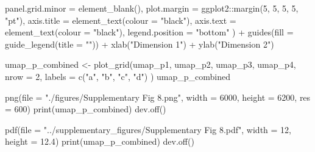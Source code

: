 \documentclass[
  11pt,
  oneside]{book}
\newenvironment{Shaded}{\begin{snugshade}}{\end{snugshade}}
\newcommand{\AttributeTok}[1]{\textcolor[rgb]{0.77,0.63,0.00}{#1}}
\newcommand{\DecValTok}[1]{\textcolor[rgb]{0.00,0.00,0.81}{#1}}
\newcommand{\FloatTok}[1]{\textcolor[rgb]{0.00,0.00,0.81}{#1}}
\newcommand{\FunctionTok}[1]{\textcolor[rgb]{0.00,0.00,0.00}{#1}}
\newcommand{\NormalTok}[1]{#1}
\newcommand{\OtherTok}[1]{\textcolor[rgb]{0.56,0.35,0.01}{#1}}
\newcommand{\SpecialCharTok}[1]{\textcolor[rgb]{0.00,0.00,0.00}{#1}}
\newcommand{\StringTok}[1]{\textcolor[rgb]{0.31,0.60,0.02}{#1}}
\begin{document}
\begin{Shaded}
\begin{Highlighting}[]
    \AttributeTok{panel.grid.minor =} \FunctionTok{element\_blank}\NormalTok{(),}
    \AttributeTok{plot.margin =}\NormalTok{ ggplot2}\SpecialCharTok{::}\FunctionTok{margin}\NormalTok{(}\DecValTok{5}\NormalTok{, }\DecValTok{5}\NormalTok{, }\DecValTok{5}\NormalTok{, }\DecValTok{5}\NormalTok{, }\StringTok{"pt"}\NormalTok{),}
    \AttributeTok{axis.title =} \FunctionTok{element\_text}\NormalTok{(}\AttributeTok{colour =} \StringTok{"black"}\NormalTok{),}
    \AttributeTok{axis.text =} \FunctionTok{element\_text}\NormalTok{(}\AttributeTok{colour =} \StringTok{"black"}\NormalTok{),}
    \AttributeTok{legend.position =} \StringTok{"bottom"}
\NormalTok{  ) }\SpecialCharTok{+}
  \FunctionTok{guides}\NormalTok{(}\AttributeTok{fill =} \FunctionTok{guide\_legend}\NormalTok{(}\AttributeTok{title =} \StringTok{""}\NormalTok{)) }\SpecialCharTok{+}
  \FunctionTok{xlab}\NormalTok{(}\StringTok{"Dimension 1"}\NormalTok{) }\SpecialCharTok{+}
  \FunctionTok{ylab}\NormalTok{(}\StringTok{"Dimension 2"}\NormalTok{)}
\end{Highlighting}
\end{Shaded}

\begin{Shaded}
\begin{Highlighting}[]
\NormalTok{umap\_p\_combined }\OtherTok{\textless{}{-}} \FunctionTok{plot\_grid}\NormalTok{(umap\_p1, umap\_p2, umap\_p3, umap\_p4,}
  \AttributeTok{nrow =} \DecValTok{2}\NormalTok{,}
  \AttributeTok{labels =} \FunctionTok{c}\NormalTok{(}\StringTok{"a"}\NormalTok{, }\StringTok{"b"}\NormalTok{, }\StringTok{"c"}\NormalTok{, }\StringTok{"d"}\NormalTok{)}
\NormalTok{)}
\NormalTok{umap\_p\_combined}
\end{Highlighting}
\end{Shaded}

\begin{Shaded}
\begin{Highlighting}[]
\FunctionTok{png}\NormalTok{(}\AttributeTok{file =} \StringTok{"./figures/Supplementary Fig 8.png"}\NormalTok{, }\AttributeTok{width =} \DecValTok{6000}\NormalTok{, }\AttributeTok{height =} \DecValTok{6200}\NormalTok{, }\AttributeTok{res =} \DecValTok{600}\NormalTok{)}
\FunctionTok{print}\NormalTok{(umap\_p\_combined)}
\FunctionTok{dev.off}\NormalTok{()}

\FunctionTok{pdf}\NormalTok{(}\AttributeTok{file =} \StringTok{"../supplementary\_figures/Supplementary Fig 8.pdf"}\NormalTok{, }\AttributeTok{width =} \DecValTok{12}\NormalTok{, }\AttributeTok{height =} \FloatTok{12.4}\NormalTok{)}
\FunctionTok{print}\NormalTok{(umap\_p\_combined)}
\FunctionTok{dev.off}\NormalTok{()}
\end{Highlighting}
\end{Shaded}
\end{document}
